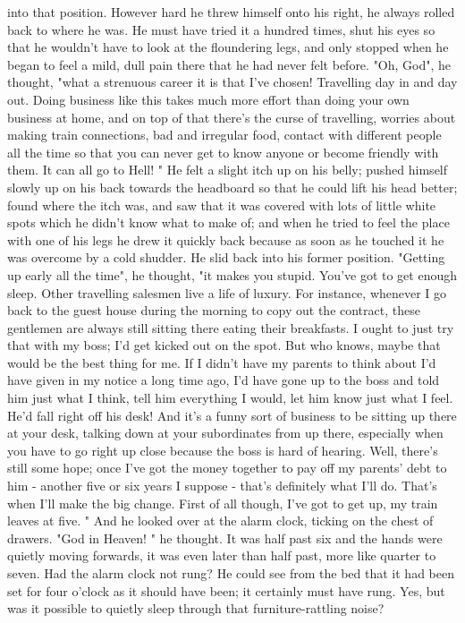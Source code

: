 \documentclass[
	listoffigures, 	%
	listoftables 	%
]{ifathesis}
\begin{document}
into that position. However hard he threw himself onto his right, he always rolled back to where he was. He must have tried it a hundred times, shut his eyes so that he wouldn't have to look at the floundering legs, and only stopped when he began to feel a mild, dull pain there that he had never felt before. "Oh, God", he thought, "what a strenuous career it is that I've chosen! Travelling day in and day out. Doing business like this takes much more effort than doing your own business at home, and on top of that there's the curse of travelling, worries about making train connections, bad and irregular food, contact with different people all the time so that you can never get to know anyone or become friendly with them. It can all go to Hell! " He felt a slight itch up on his belly; pushed himself slowly up on his back towards the headboard so that he could lift his head better; found where the itch was, and saw that it was covered with lots of little white spots which he didn't know what to make of; and when he tried to feel the place with one of his legs he drew it quickly back because as soon as he touched it he was overcome by a cold shudder. He slid back into his former position. "Getting up early all the time", he thought, "it makes you stupid. You've got to get enough sleep. Other travelling salesmen live a life of luxury. For instance, whenever I go back to the guest house during the morning to copy out the contract, these gentlemen are always still sitting there eating their breakfasts. I ought to just try that with my boss; I'd get kicked out on the spot. But who knows, maybe that would be the best thing for me. If I didn't have my parents to think about I'd have given in my notice a long time ago, I'd have gone up to the boss and told him just what I think, tell him everything I would, let him know just what I feel. He'd fall right off his desk! And it's a funny sort of business to be sitting up there at your desk, talking down at your subordinates from up there, especially when you have to go right up close because the boss is hard of hearing. Well, there's still some hope; once I've got the money together to pay off my parents' debt to him - another five or six years I suppose - that's definitely what I'll do. That's when I'll make the big change. First of all though, I've got to get up, my train leaves at five. " And he looked over at the alarm clock, ticking on the chest of drawers. "God in Heaven! " he thought. It was half past six and the hands were quietly moving forwards, it was even later than half past, more like quarter to seven. Had the alarm clock not rung? He could see from the bed that it had been set for four o'clock as it should have been; it certainly must have rung. Yes, but was it possible to quietly sleep through that furniture-rattling noise?
\end{document}

